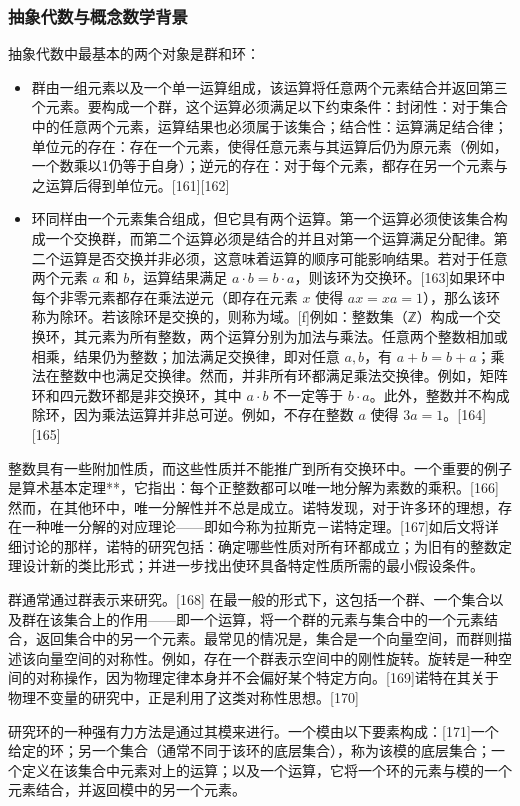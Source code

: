 \subsubsection{抽象代数与概念数学背景}
抽象代数中最基本的两个对象是群和环：
\begin{itemize}
\item 群由一组元素以及一个单一运算组成，该运算将任意两个元素结合并返回第三个元素。要构成一个群，这个运算必须满足以下约束条件：封闭性：对于集合中的任意两个元素，运算结果也必须属于该集合；结合性：运算满足结合律；单位元的存在：存在一个元素，使得任意元素与其运算后仍为原元素（例如，一个数乘以1仍等于自身）；逆元的存在：对于每个元素，都存在另一个元素与之运算后得到单位元。[161][162]
\item 环同样由一个元素集合组成，但它具有两个运算。第一个运算必须使该集合构成一个交换群，而第二个运算必须是结合的并且对第一个运算满足分配律。第二个运算是否交换并非必须，这意味着运算的顺序可能影响结果。若对于任意两个元素 $a$ 和 $b$，运算结果满足 $a\cdot b = b\cdot a$，则该环为交换环。[163]如果环中每个非零元素都存在乘法逆元（即存在元素 $x$ 使得 $ax = xa = 1$），那么该环称为除环。若该除环是交换的，则称为域。[f]例如：整数集（ℤ）构成一个交换环，其元素为所有整数，两个运算分别为加法与乘法。任意两个整数相加或相乘，结果仍为整数；加法满足交换律，即对任意 $a,b$，有 $a + b = b + a$；乘法在整数中也满足交换律。然而，并非所有环都满足乘法交换律。例如，矩阵环和四元数环都是非交换环，其中 $a\cdot b$ 不一定等于 $b\cdot a$。此外，整数并不构成除环，因为乘法运算并非总可逆。例如，不存在整数 $a$ 使得 $3a = 1$。[164][165]
\end{itemize}
整数具有一些附加性质，而这些性质并不能推广到所有交换环中。一个重要的例子是算术基本定理**，它指出：每个正整数都可以唯一地分解为素数的乘积。[166] 然而，在其他环中，唯一分解性并不总是成立。诺特发现，对于许多环的理想，存在一种唯一分解的对应理论——即如今称为拉斯克－诺特定理。[167]如后文将详细讨论的那样，诺特的研究包括：确定哪些性质对所有环都成立；为旧有的整数定理设计新的类比形式；并进一步找出使环具备特定性质所需的最小假设条件。

群通常通过群表示来研究。[168] 在最一般的形式下，这包括一个群、一个集合以及群在该集合上的作用——即一个运算，将一个群的元素与集合中的一个元素结合，返回集合中的另一个元素。最常见的情况是，集合是一个向量空间，而群则描述该向量空间的对称性。例如，存在一个群表示空间中的刚性旋转。旋转是一种空间的对称操作，因为物理定律本身并不会偏好某个特定方向。[169]诺特在其关于物理不变量的研究中，正是利用了这类对称性思想。[170]

研究环的一种强有力方法是通过其模来进行。一个模由以下要素构成：[171]一个给定的环；另一个集合（通常不同于该环的底层集合），称为该模的底层集合；一个定义在该集合中元素对上的运算；以及一个运算，它将一个环的元素与模的一个元素结合，并返回模中的另一个元素。

